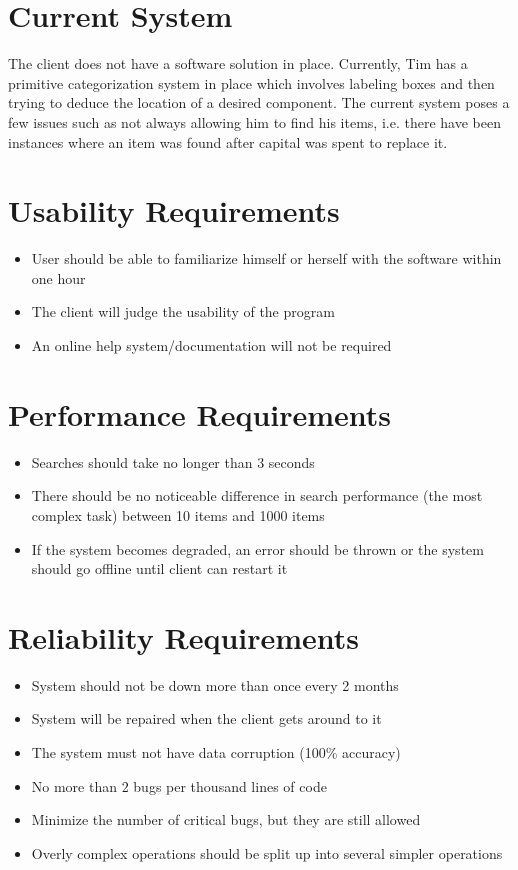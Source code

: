 \documentclass{article}
\begin{document}
\section{Current System}
The client does not have a software solution in place.  Currently, Tim has a primitive categorization system in place which involves labeling boxes and then trying to deduce the location of a desired component.  The current system poses a few issues such as not always allowing him to find his items, i.e. there have been instances where an item was found after capital was spent to replace it.

\section{Usability Requirements}
\begin{itemize}
\item User should be able to familiarize himself or herself with the software within one hour
\item The client will judge the usability of the program
\item An online help system/documentation will not be required
\end{itemize}

\section{Performance Requirements}
\begin{itemize}
\item Searches should take no longer than 3 seconds
\item There should be no noticeable difference in search performance (the most complex task) between 10 items and 1000 items
\item If the system becomes degraded, an error should be thrown or the system should go offline until client can restart it
\end{itemize}

\section{Reliability Requirements}
\begin{itemize}
\item System should not be down more than once every 2 months
\item System will be repaired when the client gets around to it
\item The system must not have data corruption (100\% accuracy)
\item No more than 2 bugs per thousand lines of code
\item Minimize the number of critical bugs, but they are still allowed
\item Overly complex operations should be split up into several simpler operations
\end{itemize}
\end{document}
